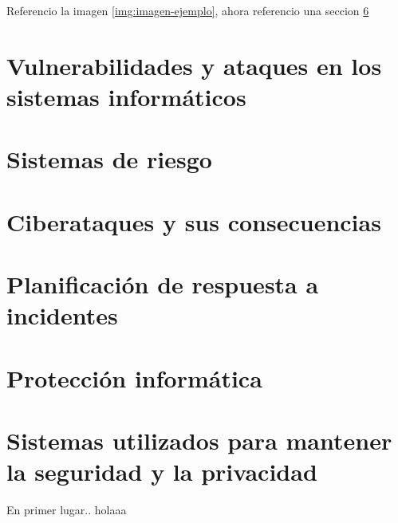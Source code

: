 Referencio la imagen \ref{img:imagen-ejemplo}, ahora referencio una seccion \ref{sec:tipos-sistemas}


\section{Vulnerabilidades y ataques en los sistemas informáticos}
\label{sec:vulneravilidades-y-ataques}



\section{Sistemas de riesgo}
\label{sec:sistemas-de-riesgo}


\section{Ciberataques y sus consecuencias}
\label{sec:ciberataques-y-consecuencias}


\section{Planificación de respuesta a incidentes}
\label{sec:planificacion-de-respuesta}


\section{Protección informática}
\label{sec:proteccion-informatica}


\section{Sistemas utilizados para mantener la seguridad y la privacidad}
\label{sec:tipos-sistemas}

En primer lugar.\cite{rstudio}. holaaa










